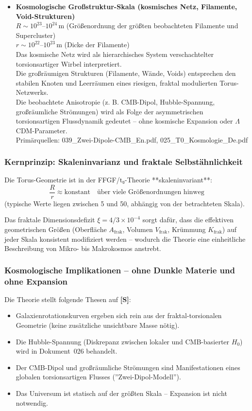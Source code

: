 \begin{itemize}
		\item \textbf{Kosmologische Großstruktur-Skala (kosmisches Netz, Filamente, Void-Strukturen)} \\
		$R \sim 10^{23}$–$10^{24}\,\text{m}$ (Größenordnung der größten beobachteten Filamente und Supercluster) \\
		$r \sim 10^{22}$–$10^{23}\,\text{m}$ (Dicke der Filamente) \\
		Das kosmische Netz wird als hierarchisches System verschachtelter torsionsartiger Wirbel interpretiert. \\
		Die großräumigen Strukturen (Filamente, Wände, Voids) entsprechen den stabilen Knoten und Leerräumen eines riesigen, fraktal modulierten Torus-Netzwerks. \\
		Die beobachtete Anisotropie (z. B. CMB-Dipol, Hubble-Spannung, großräumliche Strömungen) wird als Folge der asymmetrischen torsionsartigen Flussdynamik gedeutet – ohne kosmische Expansion oder $\Lambda$CDM-Parameter. \\
		Primärquellen: 039\_Zwei-Dipole-CMB\_En.pdf, 025\_T0\_Kosmologie\_De.pdf
	\end{itemize}
	
	\subsubsection{Kernprinzip: Skaleninvarianz und fraktale Selbstähnlichkeit}
	
	Die Torus-Geometrie ist in der FFGF/t₀-Theorie **skaleninvariant**:
	\[
	\frac{R}{r} \approx \text{konstant} \quad \text{über viele Größenordnungen hinweg}
	\]
	(typische Werte liegen zwischen 5 und 50, abhängig von der betrachteten Skala).
	
	Das fraktale Dimensionsdefizit $\xi = 4/3 \times 10^{-4}$ sorgt dafür, dass die effektiven geometrischen Größen (Oberfläche $A_{\text{frak}}$, Volumen $V_{\text{frak}}$, Krümmung $K_{\text{frak}}$) auf jeder Skala konsistent modifiziert werden – wodurch die Theorie eine einheitliche Beschreibung von Mikro- bis Makrokosmos anstrebt.
	
	\subsubsection{Kosmologische Implikationen – ohne Dunkle Materie und ohne Expansion}
	
	Die Theorie stellt folgende Thesen auf \textbf{[S]}:
	\begin{itemize}
		\item Galaxienrotationskurven ergeben sich rein aus der fraktal-torsionalen Geometrie (keine zusätzliche unsichtbare Masse nötig).
		\item Die Hubble-Spannung (Diskrepanz zwischen lokaler und CMB-basierter $H_0$) wird in Dokument~026 behandelt.
		\item Der CMB-Dipol und großräumliche Strömungen sind Manifestationen eines globalen torsionsartigen Flusses (''Zwei-Dipol-Modell'').
		\item Das Universum ist statisch auf der größten Skala – Expansion ist nicht notwendig.
	\end{itemize}
	
